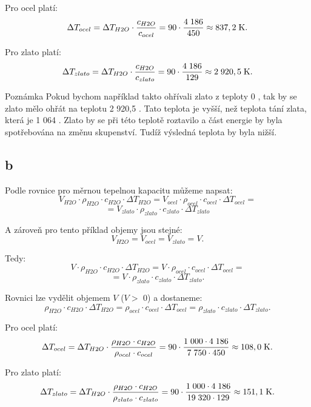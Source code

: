 \documentclass{article}
\begin{document}
Pro ocel platí:
$$
    \Delta T_{ocel} = \Delta T_{H2O} \cdot \frac{c_{H2O}}{c_{ocel}} = 90 \cdot \frac{4 \; 186}{450} \approx 837,2 \; \textrm{K}.
$$

Pro zlato platí:
$$
    \Delta T_{zlato} = \Delta T_{H2O} \cdot \frac{c_{H2O}}{c_{zlato}} = 90 \cdot \frac{4 \; 186}{129} \approx 2 \; 920,5 \; \textrm{K}.
$$

\begin{notebox}{Poznámka}
    Pokud bychom například takto ohřívali zlato z teploty 0 \ueqCELS, tak by se zlato mělo ohřát na teplotu 2 920,5 \ueqCELS. Tato teplota je vyšší, než teplota tání zlata, která je 1 064 \ueqCELS. Zlato by se při této teplotě roztavilo a část energie by byla spotřebována na změnu skupenství. Tudíž výsledná teplota by byla nižší.
\end{notebox}



\subsection{b}

Podle rovnice pro měrnou tepelnou kapacitu můžeme napsat:
$$
    V_{H2O} \cdot \rho_{H2O} \cdot c_{H2O} \cdot \Delta T_{H2O} = V_{ocel} \cdot \rho_{ocel} \cdot c_{ocel} \cdot \Delta T_{ocel} =
$$
$$
    = V_{zlato} \cdot \rho_{zlato} \cdot c_{zlato} \cdot \Delta T_{zlato}
$$

A zároveň pro tento příklad objemy jsou stejné:
$$
    V_{H2O} = V_{ocel} = V_{zlato} = V.
$$

Tedy:
$$
    V \cdot \rho_{H2O} \cdot c_{H2O} \cdot \Delta T_{H2O} = V \cdot \rho_{ocel} \cdot c_{ocel} \cdot \Delta T_{ocel} =
$$
$$
    =  V \cdot \rho_{zlato} \cdot c_{zlato} \cdot \Delta T_{zlato}.
$$

Rovnici lze vydělit objemem $V$ ($V >$ 0) a dostaneme:
$$
    \rho_{H2O} \cdot c_{H2O} \cdot \Delta T_{H2O} = \rho_{ocel} \cdot c_{ocel} \cdot \Delta T_{ocel} = \rho_{zlato} \cdot c_{zlato} \cdot \Delta T_{zlato}.
$$

Pro ocel platí:
$$
    \Delta T_{ocel} = \Delta T_{H2O} \cdot \frac{\rho_{H2O} \cdot c_{H2O}}{\rho_{ocel} \cdot c_{ocel}} = 90 \cdot \frac{1 \; 000 \cdot 4 \; 186}{7 \; 750 \cdot 450} \approx 108,0 \; \textrm{K}.
$$

Pro zlato platí:
$$
    \Delta T_{zlato} = \Delta T_{H2O} \cdot \frac{\rho_{H2O} \cdot c_{H2O}}{\rho_{zlato} \cdot c_{zlato}} = 90 \cdot \frac{1 \; 000 \cdot 4 \; 186}{19 \; 320 \cdot 129} \approx 151,1 \; \textrm{K}.
$$
\end{document}
